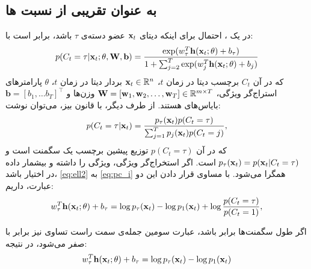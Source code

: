 \subsection{
به عنوان تقریبی از نسبت
ها
}

در یک 
،
احتمال
برای اینکه دیتای 
$\mathbf{x}_t$
عضو دسته‌ی 
$\tau$
باشد، برابر است با:
\begin{align}
p(C_t=\tau | \mathbf{x}_t; \mathbf{\theta},  \mathbf {W},  \mathbf {b})= 
\frac{\exp( w_\tau^T \mathbf{h}(\mathbf{x}_t; \mathbf{\theta})+b_\tau)}
{1+\sum_{j=2}^{T} \exp( w_j^T \mathbf{h}(\mathbf{x}_t; \mathbf{\theta})+b_j)}  \label{eq:ell2}
\end{align}
که در آن 
$C_t$
برچسب دیتا در زمان 
$t$،
$\mathbf{x}_t \in \mathbb{R}^n$
بردار دیتا در زمان $t$،
$\theta$
پارامتر‌های استراج‌گر ویژگی،
$\mathbf{W} = [\mathbf{w}_1, \mathbf{w}_2, \dots, \mathbf{w}_T] \in 
\mathbb{R}^{m \times T}$
وزن‌ها 
و 
$\mathbf{b} = [b_1, \dots b_T]^\top$
بایاس‌های 
هستند. از طرف دیگر، با قانون بیز، می‌توان نوشت:
\begin{equation}
p(C_t=\tau | \mathbf{x}_t) = \frac{p_\tau(\mathbf{x}_t)p(C_t = \tau)}
{\sum_{j=1}^{T} p_j(\mathbf{x}_t)p(C_t = j)},
\label{eq:pc_i}
\end{equation}
که در آن 
$p(C_t = \tau)$
توزیع پیشین برچسب یک سگمنت است و 
$p_\tau(\mathbf{x}_t) = p(\mathbf{x}_t| C_t = \tau)$
است. اگر استخراج‌گر ویژگی، ویژگی
را داشته و بیشمار داده در اختیار باشد، 
\eqref{eq:ell2}
به 
\eqref{eq:pc_i}
همگرا می‌شود. با مساوی قرار دادن این دو عبارت، داریم:
\begin{equation} 
w_\tau^T \mathbf{h}(\mathbf{x}_t; \mathbf{\theta}) + b_\tau 
= \log p_\tau(\mathbf{x}_t) - \log p_1(\mathbf{x}_t) + \log \frac{p(C_t = \tau)}{p(C_t = 1)} ,
\label{eq:relation}
\end{equation}

اگر طول سگمنت‌ها برابر باشد، عبارت سومین جمله‌ی سمت راست تساوی نیز برابر با صفر می‌شود، در نتیجه:
\begin{equation} 
w_\tau^T \mathbf{h}(\mathbf{x}_t; \mathbf{\theta}) + b_\tau 
= \log p_\tau(\mathbf{x}_t) - \log p_1(\mathbf{x}_t)
\label{eq:relation2}
\end{equation}


